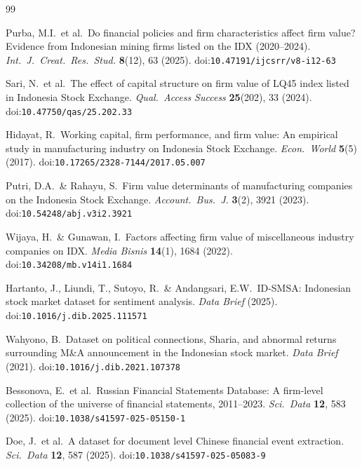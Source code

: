 \documentclass[11pt,a4paper]{article}
\begin{document}
\begin{thebibliography}{99}

Purba, M.I.\ et al.\ Do financial policies and firm characteristics affect firm value? Evidence from Indonesian mining firms listed on the IDX (2020--2024).
\textit{Int.\ J.\ Creat.\ Res.\ Stud.} \textbf{8}(12), 63 (2025).
doi:\texttt{10.47191/ijcsrr/v8-i12-63}

Sari, N.\ et al.\ The effect of capital structure on firm value of LQ45 index listed in Indonesia Stock Exchange.
\textit{Qual.\ Access Success} \textbf{25}(202), 33 (2024).
doi:\texttt{10.47750/qas/25.202.33}

Hidayat, R.\ Working capital, firm performance, and firm value: An empirical study in manufacturing industry on Indonesia Stock Exchange.
\textit{Econ.\ World} \textbf{5}(5) (2017).
doi:\texttt{10.17265/2328-7144/2017.05.007}

Putri, D.A.\ \& Rahayu, S.\ Firm value determinants of manufacturing companies on the Indonesia Stock Exchange.
\textit{Account.\ Bus.\ J.} \textbf{3}(2), 3921 (2023).
doi:\texttt{10.54248/abj.v3i2.3921}

Wijaya, H.\ \& Gunawan, I.\ Factors affecting firm value of miscellaneous industry companies on IDX.
\textit{Media Bisnis} \textbf{14}(1), 1684 (2022).
doi:\texttt{10.34208/mb.v14i1.1684}

Hartanto, J., Liundi, T., Sutoyo, R.\ \& Andangsari, E.W.\ ID-SMSA: Indonesian stock market dataset for sentiment analysis.
\textit{Data Brief} (2025).
doi:\texttt{10.1016/j.dib.2025.111571}

Wahyono, B.\ Dataset on political connections, Sharia, and abnormal returns surrounding M\&A announcement in the Indonesian stock market.
\textit{Data Brief} (2021).
doi:\texttt{10.1016/j.dib.2021.107378}

Bessonova, E.\ et al.\ Russian Financial Statements Database: A firm-level collection of the universe of financial statements, 2011--2023.
\textit{Sci.\ Data} \textbf{12}, 583 (2025).
doi:\texttt{10.1038/s41597-025-05150-1}

Doe, J.\ et al.\ A dataset for document level Chinese financial event extraction.
\textit{Sci.\ Data} \textbf{12}, 587 (2025).
doi:\texttt{10.1038/s41597-025-05083-9}


\end{thebibliography}
\end{document}
